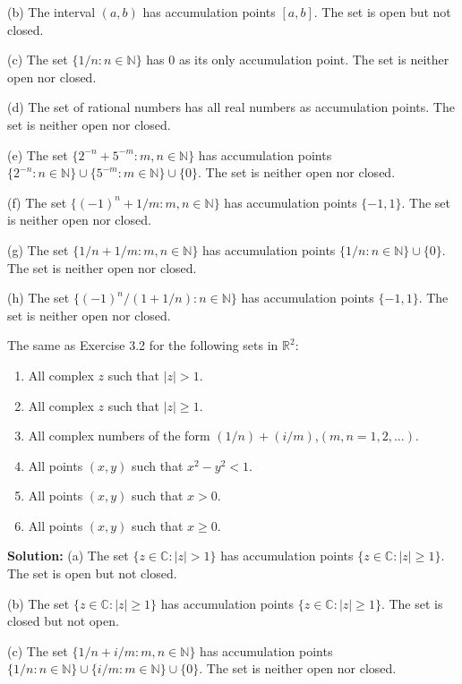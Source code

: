 (b) The interval $(a,b)$ has accumulation points $[a,b]$. The set is open but not closed.

(c) The set $\{1/n : n \in \mathbb{N}\}$ has 0 as its only accumulation point. The set is neither open nor closed.

(d) The set of rational numbers has all real numbers as accumulation points. The set is neither open nor closed.

(e) The set $\{2^{-n} + 5^{-m} : m,n \in \mathbb{N}\}$ has accumulation points $\{2^{-n} : n \in \mathbb{N}\} \cup \{5^{-m} : m \in \mathbb{N}\} \cup \{0\}$. The set is neither open nor closed.

(f) The set $\{(-1)^n + 1/m : m,n \in \mathbb{N}\}$ has accumulation points $\{-1, 1\}$. The set is neither open nor closed.

(g) The set $\{1/n + 1/m : m,n \in \mathbb{N}\}$ has accumulation points $\{1/n : n \in \mathbb{N}\} \cup \{0\}$. The set is neither open nor closed.

(h) The set $\{(-1)^n/(1+1/n) : n \in \mathbb{N}\}$ has accumulation points $\{-1, 1\}$. The set is neither open nor closed.

\begin{problembox}
The same as Exercise 3.2 for the following sets in $\mathbb{R}^2$:
\begin{enumerate}[label=\textbf{(\alph*)}]
\item All complex $z$ such that $|z| > 1$.
\item All complex $z$ such that $|z| \ge 1$.
\item All complex numbers of the form $(1/n) + (i/m)$,\quad $(m, n = 1, 2, \dots)$.
\item All points $(x, y)$ such that $x^2 - y^2 < 1$.
\item All points $(x, y)$ such that $x > 0$.
\item All points $(x, y)$ such that $x \ge 0$.
\end{enumerate}
\end{problembox}

\textbf{Solution:}
(a) The set $\{z \in \mathbb{C} : |z| > 1\}$ has accumulation points $\{z \in \mathbb{C} : |z| \geq 1\}$. The set is open but not closed.

(b) The set $\{z \in \mathbb{C} : |z| \geq 1\}$ has accumulation points $\{z \in \mathbb{C} : |z| \geq 1\}$. The set is closed but not open.

(c) The set $\{1/n + i/m : m,n \in \mathbb{N}\}$ has accumulation points $\{1/n : n \in \mathbb{N}\} \cup \{i/m : m \in \mathbb{N}\} \cup \{0\}$. The set is neither open nor closed.

